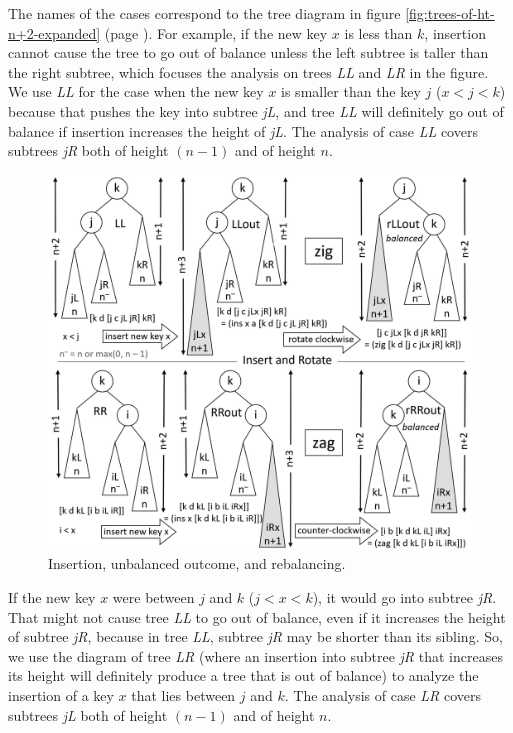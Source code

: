 The names of the cases correspond
to the tree diagram in
figure \ref{fig:trees-of-ht-n+2-expanded} (page \pageref{fig:trees-of-ht-n+2-expanded}).
For example, if the new key $x$ is less than $k$,
insertion cannot cause the tree to go out of
balance unless the left subtree is taller
than the right subtree, which focuses the
analysis on trees \emph{LL} and \emph{LR}
in the figure.
We use \emph{LL} for the case when the new key $x$
is smaller than the key $j$
($x < j < k$)
because that pushes the key into subtree \emph{jL},
and tree \emph{LL} will definitely go out of balance
if insertion increases the height of \emph{jL}.
The analysis of case \emph{LL} covers
subtrees \emph{jR} both of height $(n-1)$ and of height $n$.

\begin{figure}
\begin{center}
\includegraphics[scale=1]{images-cmyk/zig-and-zag}
\end{center}
\caption{Insertion, unbalanced outcome, and rebalancing.}
\label{fig:zig-and-zag}
\end{figure}

If the new key $x$ were between $j$ and $k$ ($j < x < k$),
it would go into subtree \emph{jR}.
That might not cause tree \emph{LL} to go out of balance,
even if it increases the height of
subtree \emph{jR}, because in tree \emph{LL},
subtree \emph{jR} may be shorter than its sibling.
So, we use the diagram of tree \emph{LR}
(where an insertion into subtree \emph{jR}
that increases its height will definitely
produce a tree that is out of balance)
to analyze the insertion of a
key $x$ that lies between $j$ and $k$.
The analysis of case \emph{LR} covers
subtrees \emph{jL} both of height $(n-1)$ and of height $n$.

